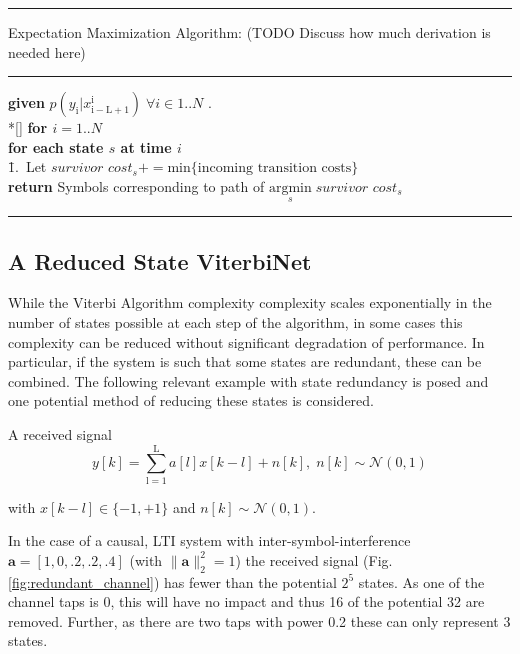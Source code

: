 \documentclass[12pt,a4paper]{report}
\begin{document}
    \noindent\rule[16pt]{\textwidth}{0.6pt}
	Expectation Maximization Algorithm: (TODO Discuss how much derivation is needed here)

    \noindent\rule[10pt]{\textwidth}{0.4pt}
    {\footnotesize
    \begin{tabbing}
        {\bf given} $p(y_{\mathrm{i}}|x_{\mathrm{i-L+1}}^{\mathrm{i}}) \; \forall i \in {1..N}$ . \\*[\smallskipamount]
        {\bf for $i = 1..N $} \\
         \qquad \= {\bf for each state $s$ at time $i$}\\
        \qquad \qquad \= 1.\ Let $\textit{survivor cost}_{s}  += \text{min}\{\text{incoming transition costs}\}$ \\
        {\bf return} Symbols corresponding to path of $\underset{s}{\text{argmin}} \; \textit{survivor cost}_{s} $
    \end{tabbing}}
    \noindent\rule[10pt]{\textwidth}{0.4pt}





\subsection{A Reduced State ViterbiNet}
While the Viterbi Algorithm complexity complexity scales exponentially in the number of states possible at each step of the algorithm, in some cases this complexity can be reduced without significant degradation of performance. In particular, if the system is such that some states are redundant, these can be combined. The following relevant example with state redundancy is posed and one potential method of reducing these states is considered. 

A received signal 
\begin{equation}
y[k] = \sum_{\mathrm{l=1}}^{\mathrm{L}} a[l]x[k-l] + n[k], \; n[k]  \sim \mathcal{N}(0,1)
\end{equation}

with $x[k-l] \in \{ -1, +1\}$ and $n[k]  \sim \mathcal{N}(0,1)$.  

In the case of a causal, LTI system with inter-symbol-interference $\mathbf{a} = [1, 0, .2, .2, .4]$ (with $\|\mathbf{a}\|^2_2 = 1$) the received signal (Fig.\ref{fig:redundant_channel}) has fewer than the potential $2^5$ states. As one of the channel taps is 0, this will have no impact and thus 16 of the potential 32 are removed. Further, as there are two taps with power 0.2 these can only represent 3 states. 
\end{document}
